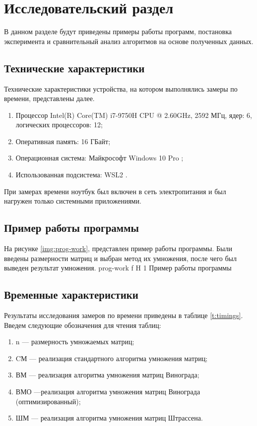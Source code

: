 \chapter{Исследовательский раздел}

В данном разделе будут приведены примеры работы программ, постановка эксперимента и сравнительный анализ алгоритмов на основе полученных данных.


\section{Технические характеристики}

Технические характеристики устройства, на котором выполнялись замеры по времени, представлены далее.

\begin{enumerate}
	\item Процессор	Intel(R) Core(TM) i7-9750H CPU @ 2.60GHz, 2592 МГц, ядер: 6, логических процессоров: 12;
	\item Оперативная память: 16 ГБайт;
	\item Операционная система: Майкрософт Windows 10 Pro \cite{windows};
	\item Использованная подсистема: WSL2 \cite{WSL2}.
\end{enumerate}

При замерах времени ноутбук был включен в сеть электропитания и был нагружен только системными приложениями.
\section{Пример работы программы}
На рисунке \ref{img:prog-work}, представлен пример работы программы. Были введены размерности матриц и выбран метод их умножения, после чего был выведен результат умножения.
{prog-work} %
{f} %
{H} %
{1\textwidth} %
{Пример работы программы} %



\section{Временные характеристики}

Результаты исследования замеров по времени приведены в таблице \ref{t:timings}.
Введем следующие обозначения для чтения таблиц:
\begin{enumerate}
	\item n --- размерность умножаемых матриц;
	\item CМ --- реализация стандартного алгоритма умножения матриц;
	\item ВМ --- реализация алгоритма умножения матриц Винограда;
	\item ВМО ---реализация алгоритма умножения матриц Винограда (оптимизированный);
	\item ШМ --- реализация алгоритма умножения матриц Штрассена.
\end{enumerate}

